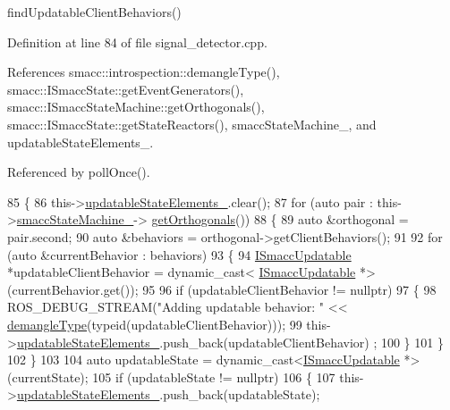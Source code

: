 find\+Updatable\+Client\+Behaviors() 

Definition at line 84 of file signal\+\_\+detector.\+cpp.



References smacc\+::introspection\+::demangle\+Type(), smacc\+::\+I\+Smacc\+State\+::get\+Event\+Generators(), smacc\+::\+I\+Smacc\+State\+Machine\+::get\+Orthogonals(), smacc\+::\+I\+Smacc\+State\+::get\+State\+Reactors(), smacc\+State\+Machine\+\_\+, and updatable\+State\+Elements\+\_\+.



Referenced by poll\+Once().


\begin{DoxyCode}
85     \{
86         this->\hyperlink{classsmacc_1_1SignalDetector_a07a5e7bb00c348435d954e22682fa610}{updatableStateElements\_}.clear();
87         \textcolor{keywordflow}{for} (\textcolor{keyword}{auto} pair : this->\hyperlink{classsmacc_1_1SignalDetector_a46025de6ac7b5980e22144f9703236a4}{smaccStateMachine\_}->
      \hyperlink{classsmacc_1_1ISmaccStateMachine_a7f5b2882dbd077584767cb2533ed3c49}{getOrthogonals}())
88         \{
89             \textcolor{keyword}{auto} &orthogonal = pair.second;
90             \textcolor{keyword}{auto} &behaviors = orthogonal->getClientBehaviors();
91 
92             \textcolor{keywordflow}{for} (\textcolor{keyword}{auto} &currentBehavior : behaviors)
93             \{
94                 \hyperlink{classISmaccUpdatable}{ISmaccUpdatable} *updatableClientBehavior = \textcolor{keyword}{dynamic\_cast<}
      \hyperlink{classISmaccUpdatable}{ISmaccUpdatable} *\textcolor{keyword}{>}(currentBehavior.get());
95 
96                 \textcolor{keywordflow}{if} (updatableClientBehavior != \textcolor{keyword}{nullptr})
97                 \{
98                     ROS\_DEBUG\_STREAM(\textcolor{stringliteral}{"Adding updatable behavior: "} << 
      \hyperlink{namespacesmacc_1_1introspection_a670e39ccea29952859df4e2d0e45077b}{demangleType}(\textcolor{keyword}{typeid}(updatableClientBehavior)));
99                     this->\hyperlink{classsmacc_1_1SignalDetector_a07a5e7bb00c348435d954e22682fa610}{updatableStateElements\_}.push\_back(updatableClientBehavior)
      ;
100                 \}
101             \}
102         \}
103 
104         \textcolor{keyword}{auto} updatableState = \textcolor{keyword}{dynamic\_cast<}\hyperlink{classISmaccUpdatable}{ISmaccUpdatable} *\textcolor{keyword}{>}(currentState);
105         \textcolor{keywordflow}{if} (updatableState != \textcolor{keyword}{nullptr})
106         \{
107             this->\hyperlink{classsmacc_1_1SignalDetector_a07a5e7bb00c348435d954e22682fa610}{updatableStateElements\_}.push\_back(updatableState);

\end{DoxyCode}
